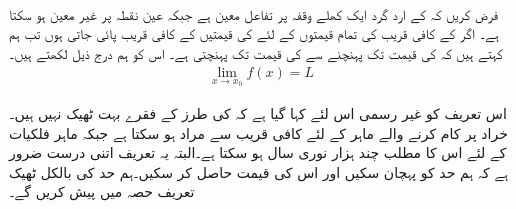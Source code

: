 \\
فرض کریں کہ  کے ارد گرد  ایک کھلے وقفہ پر تفاعل  معین ہے جبکہ عین نقطہ  پر  غیر معین ہو سکتا ہے۔ اگر  کے کافی قریب  کی  تمام قیمتوں کے لئے  کی قیمتیں  کے کافی قریب پائی جاتی ہوں تب ہم کہتے ہیں کہ  کی قیمت  تک پہنچنے سے  کی قیمت   تک پہنچتی ہے۔ اس کو ہم درج ذیل لکھتے ہیں۔
\begin{align*}
\lim_{x\to x_0} f(x)=L
\end{align*}

اس تعریف کو غیر رسمی اس لئے کہا گیا ہے کہ  کی طرز کے فقرے بہت ٹھیک نہیں ہیں۔خراد پر کام کرنے والے ماہر کے لئے کافی قریب سے مراد  ہو سکتا ہے جبکہ ماہر فلکیات کے لئے اس کا مطلب چند ہزار نوری سال ہو سکتا ہے۔البتہ یہ تعریف اتنی درست ضرور ہے کہ ہم حد کو پہچان سکیں اور اس کی قیمت حاصل کر سکیں۔ہم حد کی بالکل ٹھیک تعریف حصہ  میں  پیش کریں گے۔

